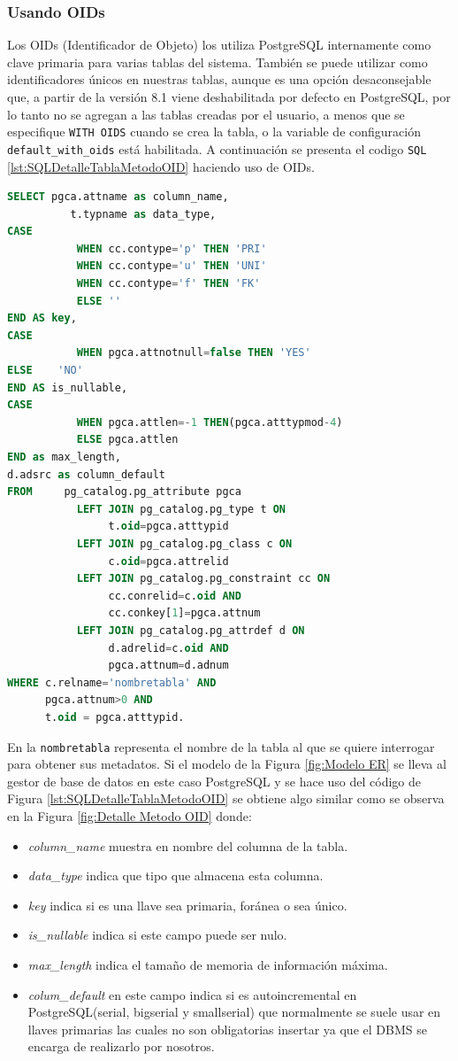 \subsubsection{Usando OIDs}
Los OIDs (Identificador de Objeto) los utiliza PostgreSQL internamente como clave primaria para varias tablas del sistema. Tambi\'en se puede utilizar como identificadores \'unicos en nuestras tablas, aunque es una opci\'on desaconsejable que, a partir de la versi\'on 8.1 viene deshabilitada por defecto en PostgreSQL, por lo tanto no se agregan a las tablas creadas por el usuario, a menos que se especifique \texttt{WITH OIDS} cuando se crea la tabla, o la variable de configuraci\'on \texttt{default\_with\_oids} est\'a habilitada.
A continuaci\'on se presenta el codigo \texttt{SQL} \ref{lst:SQLDetalleTablaMetodoOID} haciendo uso de OIDs.
\begin{lstlisting}[caption={Query para obtener detalle tabla con OIDs},label={lst:SQLDetalleTablaMetodoOID},language=sql]
SELECT pgca.attname as column_name,
	      t.typname as data_type,
CASE
		   WHEN cc.contype='p' THEN 'PRI'
		   WHEN cc.contype='u' THEN 'UNI'
		   WHEN cc.contype='f' THEN 'FK'
		   ELSE '' 
END AS key,	
CASE 
		   WHEN pgca.attnotnull=false THEN 'YES' 
ELSE    'NO' 
END AS is_nullable,
CASE 
		   WHEN pgca.attlen=-1 THEN(pgca.atttypmod-4) 
		   ELSE pgca.attlen 
END as max_length,
d.adsrc as column_default
FROM	 pg_catalog.pg_attribute pgca
		   LEFT JOIN pg_catalog.pg_type t ON
			    t.oid=pgca.atttypid
		   LEFT JOIN pg_catalog.pg_class c ON
			    c.oid=pgca.attrelid
		   LEFT JOIN pg_catalog.pg_constraint cc ON 
			    cc.conrelid=c.oid AND 
			    cc.conkey[1]=pgca.attnum
		   LEFT JOIN pg_catalog.pg_attrdef d ON
			    d.adrelid=c.oid AND 
			    pgca.attnum=d.adnum
WHERE c.relname='nombretabla' AND
	  pgca.attnum>0 AND
	  t.oid = pgca.atttypid.
\end{lstlisting}
En la \texttt{nombretabla} representa el nombre de la tabla al que se quiere interrogar para obtener sus metadatos.
Si el modelo de la Figura \ref{fig:Modelo ER} se lleva al gestor de base de datos en este caso PostgreSQL y  se hace uso del c\'odigo de Figura \ref{lst:SQLDetalleTablaMetodoOID} se obtiene algo similar como se observa en la Figura \ref{fig:Detalle Metodo OID} donde:
\begin{itemize}
\item \emph{column\_name} muestra en nombre del columna de la tabla.
\item \emph{data\_type} indica que tipo que almacena esta columna.
\item \emph{key} indica si es una llave sea primaria, for\'anea o sea \'unico.
\item \emph{is\_nullable} indica si este campo puede ser nulo.
\item \emph{max\_length} indica el tama\~no de memoria de informaci\'on m\'axima.
\item \emph{colum\_default} en este campo indica si es autoincremental en PostgreSQL(serial, bigserial y smallserial) que normalmente se suele usar en llaves primarias las cuales no son obligatorias insertar ya que el DBMS se encarga de realizarlo por nosotros.
\end{itemize}
